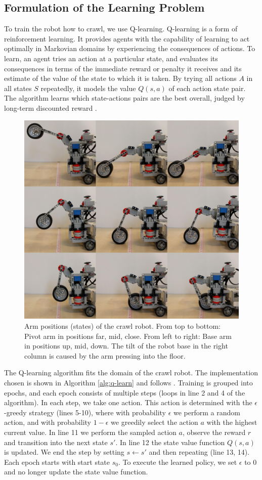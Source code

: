 \documentclass[11pt, a4paper]{article}
\begin{document}
\subsection{Formulation of the Learning Problem}
To train the robot how to crawl, we use Q-learning. Q-learning is a form of reinforcement learning. It provides agents with the capability of learning to act optimally in Markovian domains by experiencing the consequences of actions. To learn, an agent tries an action at a particular state, and evaluates its consequences in terms of the immediate reward or penalty it receives and its estimate of the value of the state to which it is taken. By trying all actions $A$ in all states $S$ repeatedly, it models the value $Q(s,a)$ of each action state pair. The algorithm learns which state-actions pairs are the best overall, judged by long-term discounted reward \cite{Watkins1992}.

\begin{figure}
	\centering
	\includegraphics[width=0.6\linewidth]{images/crawl_states}
	\caption{Arm positions (states) of the crawl robot. From top to bottom: Pivot arm in positions far, mid, close. From left to right: Base arm in positions up, mid, down. The tilt of the robot base in the right column is caused by the arm pressing into the floor.}
	\label{fig:crawl_states}
\end{figure}
\medskip
The Q-learning algorithm fits the domain of the crawl robot. The implementation chosen is shown in Algorithm \ref{alg:q-learn} and follows \cite{sutton1998introduction}. Training is grouped into epochs, and each epoch consists of multiple steps (loops in line 2 and 4 of the algorithm). In each step, we take one action. This action is determined with the $\epsilon$-greedy strategy (lines 5-10), where with probability $\epsilon$ we perform a random action, and with probability $1-\epsilon$ we greedily select the action $a$ with the highest current value. In line 11 we perform the sampled action $a$, observe the reward $r$ and transition into the next state $s'$. In line 12 the state value function $Q(s,a)$ is updated. We end the step by setting $s \leftarrow s'$ and then repeating (line 13, 14). Each epoch starts with start state $s_0$. To execute the learned policy, we set $\epsilon$ to $0$ and no longer update the state value function.
\medskip
\end{document}
